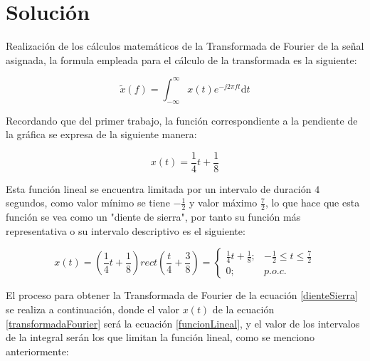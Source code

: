 \documentclass[11pt, twocolumn]{article}
\begin{document}
\section*{Solución}
    Realización de los cálculos matemáticos de la Transformada de Fourier de la señal 
    asignada, la formula empleada para el cálculo de la transformada es la siguiente:

    \begin{equation}
        \tilde{x}(f)=\int_{-\infty}^{\infty}x(t)e^{-j2\pi ft} \mathrm{d}t
        \label{transformadaFourier}
    \end{equation}

    Recordando que del primer trabajo, la función correspondiente a la pendiente de la 
    gráfica se expresa de la siguiente manera:

    \begin{equation}
        x(t)=\frac{1}{4} t + \frac{1}{8}
        \label{funcionLineal}
    \end{equation}

    Esta función lineal se encuentra limitada por un intervalo de duración $4$ segundos, como valor
    mínimo se tiene $-\frac{1}{2}$ y valor máximo $\frac{7}{2}$, lo que hace que esta 
    función se vea como un "diente de sierra", por tanto su función más representativa o
    su intervalo descriptivo es el siguiente:
    
    \onecolumn
    \begin{equation}
        x(t)=\left(\frac{1}{4} t + \frac{1}{8}\right)rect\left(\frac{t}{4} + \frac{3}{8}\right)
         =\left\lbrace  \begin{array}{ll}
                            \frac{1}{4} t + \frac{1}{8}; & -\frac{1}{2} \leq t \leq \frac{7}{2} \\
                            0; & p.o.c.
                        \end{array}
             \right.
        \label{dienteSierra}
    \end{equation}

    El proceso para obtener la Transformada de Fourier de la ecuación \ref{dienteSierra} 
    se realiza a continuación, donde el valor $x(t)$ de la ecuación \ref{transformadaFourier} será la 
    ecuación \ref{funcionLineal}, y el valor de los intervalos de la integral serán los que 
    limitan la función lineal, como se menciono anteriormente: \cite{silviaRB}
\end{document}
